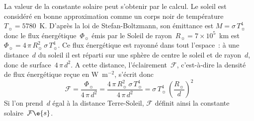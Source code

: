 \sk
La valeur de la constante solaire peut s'obtenir par le calcul. Le soleil est considéré en bonne approximation comme un corps noir de température~$T_{\sun} = 5780$~K. D'après la loi de Stefan-Boltzmann, son émittance est $M = \sigma \, T_{\sun}^4$ donc le flux énergétique~$\Phi_{\sun}$ émis par le Soleil de rayon~$R_{\sun} = 7 \times 10^5$~km est~$\Phi_{\sun} = 4 \, \pi \, R_{\sun}^2 \, \sigma \, T_{\sun}^4$. Ce flux énergétique est rayonné dans tout l'espace~: à une distance~$d$ du soleil il est réparti sur une sphère de centre le soleil et de rayon~$d$, donc de surface~$4 \, \pi \, d^2$. A cette distance, l'éclairement~$\mathcal{F}$, c'est-à-dire la densité de flux énergétique reçue en W~m$^{-2}$, s'écrit donc
\[ \mathcal{F} = \frac{\Phi_{\sun}}{4 \, \pi \, d^2} = \frac{4 \, \pi \, R_{\sun}^2 \, \sigma \, T_{\sun}^4}{4 \, \pi \, d^2} = \sigma \, T_{\sun}^4 \, \left( \frac{R_{\sun}}{d} \right)^2 \]
Si l'on prend~$d$ égal à la distance Terre-Soleil, $\mathcal{F}$ définit ainsi la constante solaire~$\mathcal{F}\e{s}$.

